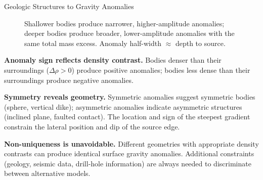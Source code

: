 \begin{activity}{Geologic Structures to Gravity Anomalies}
\begin{figure}[h]
\caption{Shallower bodies produce narrower, higher-amplitude anomalies; deeper bodies produce broader, lower-amplitude anomalies with the same total mass excess. Anomaly half-width $\approx$ depth to source.}
\end{figure}

\textbf{Anomaly sign reflects density contrast.} Bodies denser than their surroundings ($\Delta\rho > 0$) produce positive anomalies; bodies less dense than their surroundings produce negative anomalies.

\textbf{Symmetry reveals geometry.} Symmetric anomalies suggest symmetric bodies (sphere, vertical dike); asymmetric anomalies indicate asymmetric structures (inclined plane, faulted contact). The location and sign of the steepest gradient constrain the lateral position and dip of the source edge.

\textbf{Non-uniqueness is unavoidable.} Different geometries with appropriate density contrasts can produce identical surface gravity anomalies. Additional constraints (geology, seismic data, drill-hole information) are always needed to discriminate between alternative models.


\end{activity}